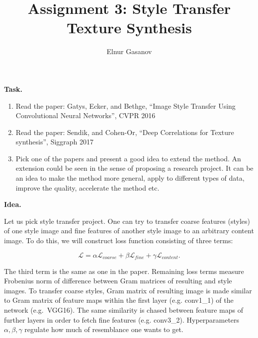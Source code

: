 \documentclass{article}
\title{Assignment 3: Style Transfer Texture Synthesis}
\author{Elnur Gasanov}
\date{}
\begin{document}
\maketitle

{\bfseries Task.}
\begin{enumerate}
	\item Read the paper: Gatys, Ecker, and Bethge, “Image Style Transfer Using Convolutional Neural Networks”, CVPR 2016
	\item Read the paper: Sendik, and Cohen-Or, “Deep Correlations for Texture synthesis”, Siggraph 2017
	\item Pick one of the papers and present a good idea to extend the method. An extension could be seen in the sense of proposing a research project. It can be an idea to make the method more general, apply to different types of data, improve the quality, accelerate the method etc.
\end{enumerate}
	
{\bfseries Idea.}

Let us pick style transfer project. One can try to transfer coarse features (styles) of one style image and fine features of another style image to an arbitrary content image. To do this, we will construct loss function consisting of three terms:

$$
\mathcal{L} = \alpha \mathcal{L}_{coarse} + \beta \mathcal{L}_{fine} + \gamma \mathcal{L}_{content}.
$$

The third term is the same as one in the paper. Remaining loss terms measure Frobenius norm of difference between Gram matrices of resulting and style images. To transfer coarse styles, Gram matrix of resulting image is made similar to Gram matrix of feature maps within the first layer (e.g. conv1\_1) of the network (e.g.~VGG16). The same similarity is chased between feature maps of further layers in order to fetch fine features (e.g. conv3\_2). Hyperparameters $\alpha, \beta, \gamma$ regulate how much of resemblance one wants to get. 
\end{document}
